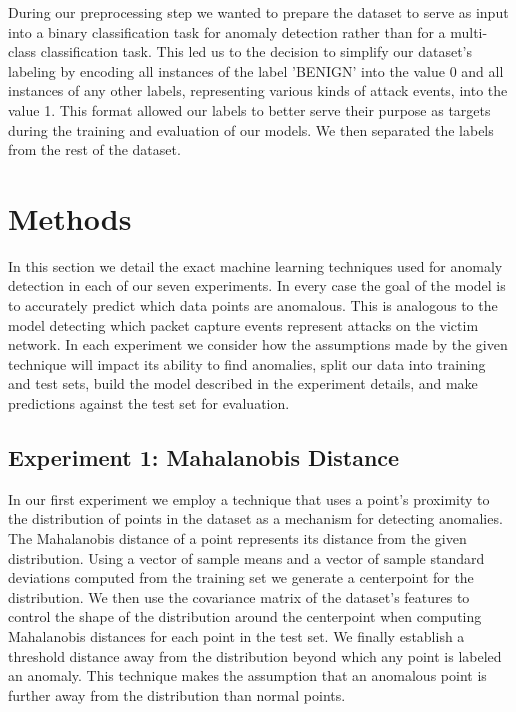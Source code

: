 \documentclass[conference]{IEEEtran}
\begin{document}
During our preprocessing step we wanted to prepare the dataset to serve as input into a binary classification task for anomaly detection rather than for a multi-class classification task. This led us to the decision to simplify our dataset's labeling by encoding all instances of the label 'BENIGN' into the value 0 and all instances of any other labels, representing various kinds of attack events, into the value 1. This format allowed our labels to better serve their purpose as targets during the training and evaluation of our models. We then separated the labels from the rest of the dataset.

\section{Methods}

In this section we detail the exact machine learning techniques used for anomaly detection in each of our seven experiments. In every case the goal of the model is to accurately predict which data points are anomalous. This is analogous to the model detecting which packet capture events represent attacks on the victim network. In each experiment we consider how the assumptions made by the given technique will impact its ability to find anomalies, split our data into training and test sets, build the model described in the experiment details, and make predictions against the test set for evaluation.

\subsection*{Experiment 1: Mahalanobis Distance}

In our first experiment we employ a technique that uses a point's proximity to the distribution of points in the dataset as a mechanism for detecting anomalies. The Mahalanobis distance of a point represents its distance from the given distribution. Using a vector of sample means and a vector of sample standard deviations computed from the training set we generate a centerpoint for the distribution. We then use the covariance matrix of the dataset's features to control the shape of the distribution around the centerpoint when computing Mahalanobis distances for each point in the test set. We finally establish a threshold distance away from the distribution beyond which any point is labeled an anomaly. This technique makes the assumption that an anomalous point is further away from the distribution than normal points.
\end{document}
